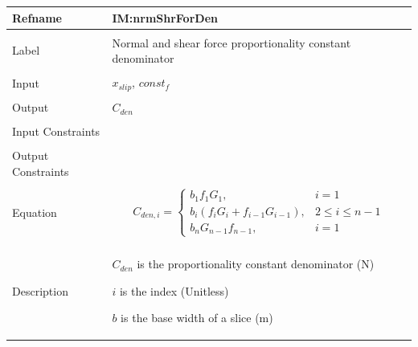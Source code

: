 \documentclass[12pt]{article}
\begin{document}
\noindent \begin{minipage}{\textwidth}
\begin{tabular}{p{} p{}}
\toprule \textbf{Refname} & \textbf{IM:nrmShrForDen}
\label{IM:nrmShrForDen}
\\ \midrule \\
Label & Normal and shear force proportionality constant denominator
        \\ \midrule \\
        Input & ${x_{slip}}$, $const_f$
                \\ \midrule \\
                Output & ${C_{den}}$
                         \\ \midrule \\
                         Input Constraints & \\ \midrule \\
                                             Output Constraints & \\ \midrule \\
                                                                  Equation & \begin{displaymath}
                                                                             {C_{den,i}}=\begin{cases}
b_{1} f_{1} G_{1}, & i=1\\
b_{i} \left(f_{i} G_{i}+f_{i-1} G_{i-1}\right), & 2\leq{}i\leq{}n-1\\
b_{n} G_{n-1} f_{n-1}, & i=1
\end{cases}
                                                                             \end{displaymath}
                                                                             \\ \midrule \\
                                                                             Description & \begin{symbDescription}
                                                                                           \item{${C_{den}}$ is the proportionality constant denominator (N)}
                                                                                           \item{$i$ is the index (Unitless)}
                                                                                           \item{$b$ is the base width of a slice (m)}

\end{symbDescription}
\end{tabular}
\end{minipage}
\end{document}
